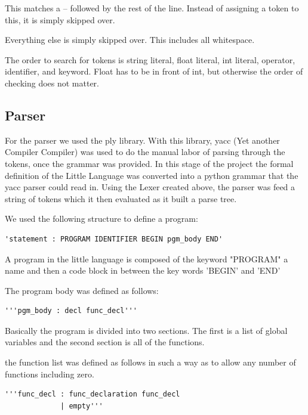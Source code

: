\documentclass[12pt]{article}
\begin{document}
                This matches a -- followed by the rest of the line. Instead of assigning a token to this, it is simply skipped over.

                Everything else is simply skipped over. This includes all whitespace.

                The order to search for tokens is string literal, float literal, int literal, operator, identifier, and keyword. Float has to be in front of int, but otherwise the order of checking does not matter.




    	\subsection{Parser}
    		For the parser we used the ply library.  With this library, yacc (Yet another Compiler Compiler) was used to do the manual labor of parsing through the tokens, once the grammar was provided.   In this stage of the project the formal definition of the Little Language was converted into a python grammar that the yacc parser could read in.  Using the Lexer created above, the parser was feed a string of tokens which it then evaluated as it built a parse tree.  
    		
    		We used the following structure to define a program: 
    		\begin{verbatim}
'statement : PROGRAM IDENTIFIER BEGIN pgm_body END'
           \end{verbatim}
           
           A program in the little language is composed of the keyword "PROGRAM" a name and then a code block in between the key words 'BEGIN' and 'END'
           
           The program body was defined as follows:
           \begin{verbatim}
'''pgm_body : decl func_decl'''
           \end{verbatim}
           
           Basically the program is divided into two sections.  The first is a list of global variables and the second section is all of the functions.
           
           the function list was defined as follows in such a way as to allow any number of functions including zero.
           
           \begin{verbatim}
'''func_decl : func_declaration func_decl
             | empty'''
            \end{verbatim}
            
\end{document}
